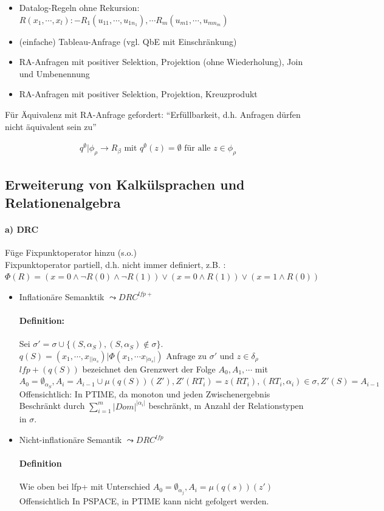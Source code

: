 \documentclass[12pt, a4paper]{article}
\begin{document}
\begin{itemize}
\item Datalog-Regeln ohne Rekursion: $R(x_1, \cdots, x_l) :- R_1(u_{11}, \cdots, u_{1n_1}), \cdots R_m(u_{m1}, \cdots, u_{mn_m})$
\item (einfache) Tableau-Anfrage (vgl. QbE mit Einschränkung)
\item RA-Anfragen mit positiver Selektion, Projektion (ohne Wiederholung), Join und Umbenennung
\item RA-Anfragen mit positiver Selektion, Projektion, Kreuzprodukt
\end{itemize}

Für Äquivalenz mit RA-Anfrage gefordert: ``Erfüllbarkeit, d.h. Anfragen dürfen nicht äquivalent sein zu''

\begin{align*}
q^\emptyset | \phi_\rho \rightarrow R_\beta \text{ mit } q^\emptyset(z) = \emptyset \text{ für alle } z \in \phi_\rho
\end{align*}

\subsection*{Erweiterung von Kalkülsprachen und Relationenalgebra}

\paragraph{a) DRC} Füge Fixpunktoperator hinzu (s.o.) \\ 
Fixpunktoperator partiell, d.h. nicht immer definiert, z.B. : $\Phi(R) = (x = 0 \wedge \lnot R(0) \wedge \lnot R(1)) \vee (x = 0 \wedge R(1)) \vee (x = 1 \wedge R(0))$

\begin{itemize}
	\item Inflationäre Semanktik $\leadsto DRC^{lfp+}$ 
	\paragraph{Definition: } Sei $\sigma' = \sigma \cup \{(S, \alpha_S), (S, \alpha_S) \not \in \sigma \}.$ \\ 
	$q(S) = (x_1, \cdots, x_{||\alpha_s}) | \Phi(x_1, \cdots x_{|\alpha_s|}) \text{ Anfrage zu } \sigma' \text { und } z \in \delta_\rho$ \\
	$lfp+(q(S))$ bezeichnet den Grenzwert der Folge $A_0, A_1, \cdots$ mit $A_0 = \emptyset_{\alpha_S}, A_i = A_{i-1} \cup \mu(q(S))(Z'), Z'(RT_i) = z(RT_i), (RT_i, \alpha_i) \in \sigma, Z'(S) = A_{i-1}$
	Offensichtlich: In PTIME, da monoton und jeden Zwischenergebnis Beschränkt durch $\sum^m_{i=1} |Dom|^{|\alpha_i|}$ beschränkt, m Anzahl der Relationstypen in $\sigma$.
	\item Nicht-inflationäre Semantik $\leadsto DRC^{lfp}$
	\paragraph{Definition} Wie oben bei lfp+ mit Unterschied $A_0 = \emptyset_{\alpha_j}, A_i = \mu(q(s))(z')$ \\
	Offensichtlich In PSPACE, in PTIME kann nicht gefolgert werden.
\end{itemize}
\end{document}
